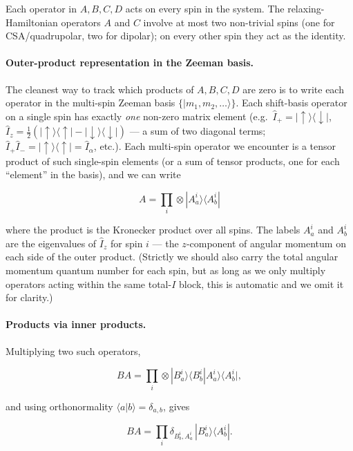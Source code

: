 \documentclass[notitlepage,11pt]{article}
\begin{document}
Each operator in $A,B,C,D$ acts on every spin in the system. The relaxing-Hamiltonian operators $A$ and $C$ involve at most two non-trivial spins (one for CSA/quadrupolar, two for dipolar); on every other spin they act as the identity.

\paragraph{Outer-product representation in the Zeeman basis.} The cleanest way to track which products of $A,B,C,D$ are zero is to write each operator in the multi-spin Zeeman basis $\{|m_1,m_2,\ldots\rangle\}$. Each shift-basis operator on a single spin has exactly \emph{one} non-zero matrix element (e.g.\ $\hat{I}_+ = |\!\uparrow\rangle\langle\downarrow\!|$, $\hat{I}_z = \tfrac{1}{2}(|\!\uparrow\rangle\langle\uparrow\!|-|\!\downarrow\rangle\langle\downarrow\!|)$ — a sum of two diagonal terms; $\hat{I}_+\hat{I}_-=|\!\uparrow\rangle\langle\uparrow\!|=\hat{I}_\alpha$, etc.). Each multi-spin operator we encounter is a tensor product of such single-spin elements (or a sum of tensor products, one for each ``element'' in the basis), and we can write

   \begin{equation}
     A = \prod_i \otimes |A_{a}^i\rangle\langle A_{b}^i|
     \end{equation}

where the product is the Kronecker product over all spins. The labels $A_a^i$ and $A_b^i$ are the eigenvalues of $\hat{I}_z$ for spin $i$ — the $z$-component of angular momentum on each side of the outer product. (Strictly we should also carry the total angular momentum quantum number for each spin, but as long as we only multiply operators acting within the same total-$I$ block, this is automatic and we omit it for clarity.)

\paragraph{Products via inner products.} Multiplying two such operators,

   \begin{equation}
     B A = \prod_i \otimes |B_{a}^i\rangle\langle B_{b}^i | A_{a}^i\rangle\langle A_{b}^i|,
     \end{equation}

and using orthonormality $\langle a|b\rangle=\delta_{a,b}$, gives

   \begin{equation}
     B A = \prod_i \delta_{B_{b}^i,A_{a}^i}\, |B_{a}^i\rangle\langle A_{b}^i|.
   \end{equation}
\end{document}
